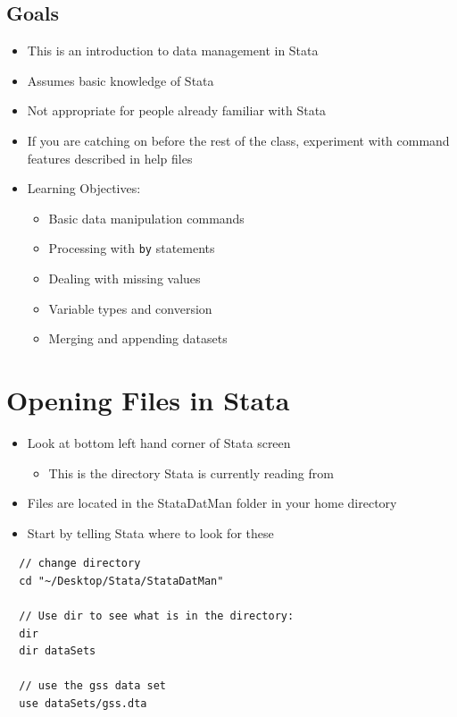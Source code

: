 \documentclass[]{book}
\providecommand{\tightlist}{%
  \setlength{\itemsep}{0pt}\setlength{\parskip}{0pt}}
\begin{document}
\subsection{Goals}\label{goals-7}

\begin{itemize}
\tightlist
\item
  This is an introduction to data management in Stata
\item
  Assumes basic knowledge of Stata
\item
  Not appropriate for people already familiar with Stata
\item
  If you are catching on before the rest of the class, experiment with
  command features described in help files
\item
  Learning Objectives:

  \begin{itemize}
  \tightlist
  \item
    Basic data manipulation commands
  \item
    Processing with \texttt{by} statements
  \item
    Dealing with missing values
  \item
    Variable types and conversion
  \item
    Merging and appending datasets
  \end{itemize}
\end{itemize}

\section{Opening Files in Stata}\label{opening-files-in-stata}

\begin{itemize}
\tightlist
\item
  Look at bottom left hand corner of Stata screen

  \begin{itemize}
  \tightlist
  \item
    This is the directory Stata is currently reading from
  \end{itemize}
\item
  Files are located in the StataDatMan folder in your home directory
\item
  Start by telling Stata where to look for these
\end{itemize}

\begin{verbatim}
  // change directory
  cd "~/Desktop/Stata/StataDatMan"

  // Use dir to see what is in the directory:
  dir
  dir dataSets

  // use the gss data set
  use dataSets/gss.dta
\end{verbatim}
\end{document}
